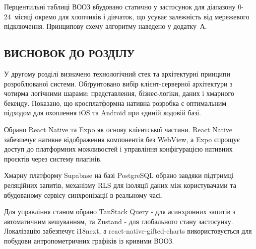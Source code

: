 Перцентильні таблиці \gls{ВООЗ} вбудовано статично у застосунок для діапазону 0-24~місяці окремо для хлопчиків і дівчаток, що усуває залежність від мережевого підключення. Принципову схему алгоритму наведено у додатку~А.

\begin{conclusionsection}

\section{ВИСНОВОК ДО РОЗДІЛУ}

У другому розділі визначено технологічний стек та архітектурні принципи розроблюваної системи. Обґрунтовано вибір клієнт-серверної архітектури з чотирма логічними шарами: представлення, бізнес-логіки, даних і хмарного бекенду. Показано, що кросплатформна нативна розробка є оптимальним підходом для охоплення iOS та Android при єдиній кодовій базі.

Обрано React Native та Expo як основу клієнтської частини. React Native забезпечує нативне відображення компонентів без WebView, а Expo спрощує доступ до платформних можливостей і управління конфігурацією нативних проєктів через систему плагінів.

Хмарну платформу Supabase на базі PostgreSQL обрано завдяки підтримці реляційних запитів, механізму \gls{RLS} для ізоляції даних між користувачами та вбудованому сервісу синхронізації в реальному часі.

Для управління станом обрано TanStack Query - для асинхронних запитів з автоматичним кешуванням, та Zustand - для глобального стану застосунку. Локалізацію забезпечує i18next, а react-native-gifted-charts використовується для побудови антропометричних графіків із кривими \gls{ВООЗ}.

\end{conclusionsection}
